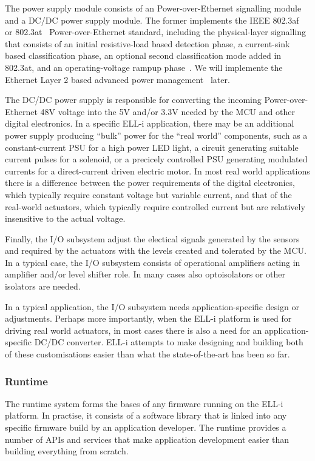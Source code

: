 \documentclass[final]{siamltex}
\begin{document}
The power supply module consists of an Power-over-Ethernet signalling
module and a DC/DC power supply module.  The former implements the
IEEE 802.3af~\cite{802.3af} or 802.3at~\cite{802.3at}
Power-over-Ethernet standard, including the physical-layer signalling
that consists of an initial resistive-load based detection phase, a
current-sink based classification phase, an optional second
classification mode added in 802.3at, and an operating-voltage rampup
phase~\cite{802.3at}.  We will implemente the Ethernet Layer 2
based advanced power management~\cite{802.3at} later.

The DC/DC power supply is responsible for converting the incoming
Power-over-Ethernet 48V voltage into the 5V and/or 3.3V needed by the
MCU and other digital electronics.  In a specific ELL-i application,
there may be an additional power supply producing ``bulk'' power for
the ``real world'' components, such as a constant-current PSU for a
high power LED light, a circuit generating suitable current pulses for
a solenoid, or a precicely controlled PSU generating modulated
currents for a direct-current driven electric motor.  In most real
world applications there is a difference between the power
requirements of the digital electronics, which typically require
constant voltage but variable current, and that of the real-world
actuators, which typically require controlled current but are
relatively insensitive to the actual voltage.

Finally, the I/O subsystem adjust the electical signals generated by
the sensors and required by the actuators with the levels created and
tolerated by the MCU.  In a typical case, the I/O subsystem consists
of operational amplifiers acting in amplifier and/or level shifter
role.  In many cases also optoisolators or other isolators are needed.

In a typical application, the I/O subsystem needs application-specific
design or adjustments.  Perhaps more importantly, when the ELL-i
platform is used for driving real world actuators, in most cases there
is also a need for an application-specific DC/DC converter.  ELL-i
attempts to make designing and building both of these customisations
easier than what the state-of-the-art has been so far.

\subsubsection{Runtime}
\label{sssec:runtime}

The runtime system forms the bases of any firmware running on the
ELL-i platform.  In practise, it consists of a software library that
is linked into any specific firmware build by an application
developer.  The runtime provides a number of APIs and services that make
application development easier than building everything from scratch.
\end{document}
